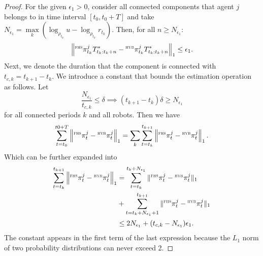 \documentclass[journal]{IEEEtran}
\theoremstyle{remark}
\newcommand{\suf}[1]{\textsc{\tiny #1}}  %
\theoremstyle{definition}
\begin{document}
\begin{proof}
For the given $\epsilon_1 > 0$, consider all connected components that agent $j$ belongs to in time interval $[t_0,t_0+T]$ and  
take ${N_{\epsilon_1}}  = \underset{k}{\max}(\log_{\rho_{t_k}}u - \log_{\rho_{t_k}}r_{t_k})$. Then, for all $n \geq N_{\epsilon_1}$:
\begin{equation}
\label{eq:conv}
\left\| 
{}^\suf{FHS}\pi^j_{t_{k}} T^*_{t_{k}:t_{k}+n}  - {}^\suf{HYB}\pi^j_{t_{k}} T^*_{t_{k}:t_{k}+n} 
\right\|_1 \leq \epsilon_1.
\end{equation}
Next, we denote the duration that the component is connected with $t_{c,k} = t_{k+1} - t_{k}$. We introduce a constant that bounds the estimation operation as follows. Let
\begin{equation}
\label{eq:deltaineq}
\frac{N_{\epsilon_1}}{t_{c,k}} \le \delta \implies (t_{k+1}-t_k)\delta \ge N_{\epsilon_1}
\end{equation}
for all connected periods $k$ and all robots. 
Then we have 
\begin{equation}
\sum_{t=t_0}^{t0+T} \left\| {}^\suf{FHS}\pi_{t}^{j} - {}^\suf{HYB}\pi_{t}^{j} \right\|_1 = 	\sum_{k} \sum_{t=t_{k}}^{t_{k+1}} \left\| {}^\suf{FHS}\pi_{t}^{j} - {}^\suf{HYB}\pi_{t}^{j}\right\|_1.
\end{equation}
Which can be further expanded into
\begin{align}
\label{eq:timeterms}
\sum_{t=t_{k}}^{t_{k+1}} \left\| {}^\suf{FHS}\pi_{t}^{j} - {}^\suf{HYB}\pi_{t}^{j}\right\|_1 & =
\sum_{t = t_{k}}^{t_{k}+ N_{\epsilon_1}}\| {}^\suf{FHS}\pi_{t}^{j} - {}^\suf{HYB}\pi_{t}^{j}\|_1 \nonumber \\
& +  \sum_{t=t_{k}+ N_{\epsilon_1} + 1}^{t_{k+1}}\| {}^\suf{FHS}\pi_{t}^{j} - {}^\suf{HYB}\pi_{t}^{j}\|_1 \nonumber \\
& \leq 2 N_{\epsilon_1} + (t_{c, k} - N_{\epsilon_1}) \epsilon_1.
\end{align}	
The constant appears in the first term of the last expression because the $L_1$ norm of two probability distributions can never exceed 2.


\end{proof}
\end{document}
